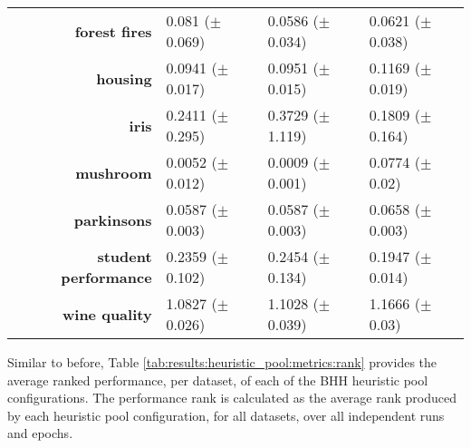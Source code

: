 \begin{table}[htb]
{\begin{tabular}{r|lll}
			\textbf{forest fires}        & \cellcolor[rgb]{ .973,  .412,  .42}0.081 ($\pm$0.069)           & \cellcolor[rgb]{ .388,  .745,  .482}0.0586 ($\pm$0.034) & \cellcolor[rgb]{ 1,  .922,  .518}0.0621 ($\pm$0.038)    \\
			\textbf{housing}             & \cellcolor[rgb]{ .388,  .745,  .482}0.0941 ($\pm$0.017)         & \cellcolor[rgb]{ 1,  .922,  .518}0.0951 ($\pm$0.015)    & \cellcolor[rgb]{ .973,  .412,  .42}0.1169 ($\pm$0.019)  \\
			\textbf{iris}                & \cellcolor[rgb]{ 1,  .922,  .518}0.2411 ($\pm$0.295)            & \cellcolor[rgb]{ .973,  .412,  .42}0.3729 ($\pm$1.119)  & \cellcolor[rgb]{ .388,  .745,  .482}0.1809 ($\pm$0.164) \\
			\textbf{mushroom}            & \cellcolor[rgb]{ 1,  .922,  .518}0.0052 ($\pm$0.012)            & \cellcolor[rgb]{ .388,  .745,  .482}0.0009 ($\pm$0.001) & \cellcolor[rgb]{ .973,  .412,  .42}0.0774 ($\pm$0.02)   \\
			\textbf{parkinsons}          & \cellcolor[rgb]{ 1,  .922,  .518}0.0587 ($\pm$0.003)            & \cellcolor[rgb]{ .388,  .745,  .482}0.0587 ($\pm$0.003) & \cellcolor[rgb]{ .973,  .412,  .42}0.0658 ($\pm$0.003)  \\
			\textbf{student performance} & \cellcolor[rgb]{ 1,  .922,  .518}0.2359 ($\pm$0.102)            & \cellcolor[rgb]{ .973,  .412,  .42}0.2454 ($\pm$0.134)  & \cellcolor[rgb]{ .388,  .745,  .482}0.1947 ($\pm$0.014) \\
			\textbf{wine quality}        & \cellcolor[rgb]{ .388,  .745,  .482}1.0827 ($\pm$0.026)         & \cellcolor[rgb]{ 1,  .922,  .518}1.1028 ($\pm$0.039)    & \cellcolor[rgb]{ .973,  .412,  .42}1.1666 ($\pm$0.03)   \\
		\end{tabular}%

	}
\end{table}%

Similar to before, Table \ref{tab:results:heuristic_pool:metrics:rank} provides the average ranked performance, per dataset, of each of the \acs{BHH} heuristic pool configurations. The performance rank is calculated as the average rank produced by each heuristic pool configuration, for all datasets, over all independent runs and epochs.

